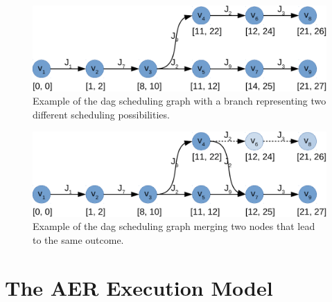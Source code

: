 \documentclass{kththesis}
\begin{document}
\begin{figure}

    \centering

    \includegraphics[width=0.8\linewidth]{images/scheduling_graph.pdf}

    \caption{Example of the \acrshort{dag} scheduling graph with a branch representing two different
        scheduling possibilities.}

    \label{fig:scheduling_graph}

\end{figure}


\begin{figure}

    \centering

    \includegraphics[width=0.8\linewidth]{images/scheduling_graph_merge.pdf}

    \caption{Example of the \acrshort{dag} scheduling graph merging two nodes that lead to the same
    outcome.}

    \label{fig:scheduling_graph_merge}

\end{figure}

\section{The AER Execution Model} \label{sec:aer_execution_model}
\end{document}
